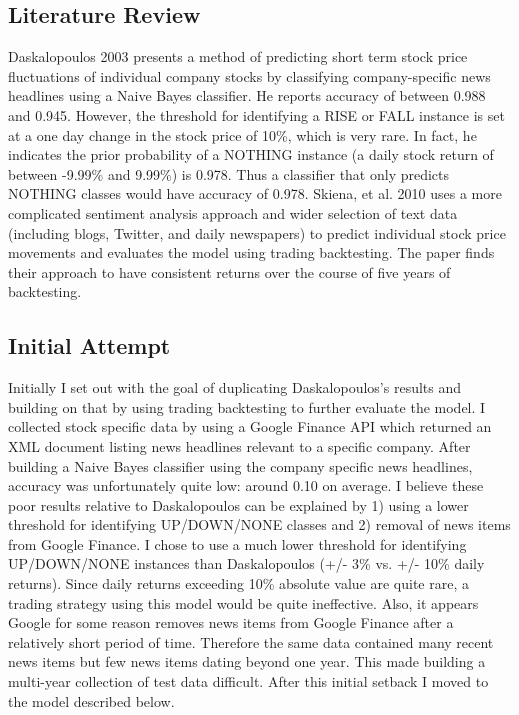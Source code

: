 \documentclass[]{article}
\begin{document}
\subsection{Literature Review}
Daskalopoulos 2003 presents a method of predicting short term stock price fluctuations of individual company stocks by classifying company-specific news headlines using a Naive Bayes classifier\cite{dask03}.  He reports accuracy of between 0.988 and 0.945.  However, the threshold for identifying a RISE or FALL instance is set at a one day change in the stock price of 10\%, which is very rare.  In fact, he indicates the prior probability of a NOTHING instance (a daily stock return of between -9.99\% and 9.99\%) is 0.978.  Thus a classifier that only predicts NOTHING classes would have accuracy of 0.978. Skiena, et al. 2010 uses a more complicated sentiment analysis approach and wider selection of text data (including blogs, Twitter, and daily newspapers) to predict individual stock price movements and evaluates the model using trading backtesting.  The paper finds their approach to have consistent returns over the course of five years of backtesting\cite{skiena10}. 
\subsection{Initial Attempt}
Initially I set out with the goal of duplicating Daskalopoulos's\cite{dask03} results and building on that by using trading backtesting to further evaluate the model.  I collected stock specific data by using a Google Finance API which returned an XML document listing news headlines relevant to a specific company.  After building a Naive Bayes classifier using the company specific news headlines, accuracy was unfortunately quite low: around 0.10 on average.  I believe these poor results relative to Daskalopoulos can be explained by 1) using a lower threshold for identifying UP/DOWN/NONE classes and 2) removal of news items from Google Finance.  I chose to use a much lower threshold for identifying UP/DOWN/NONE instances than Daskalopoulos (+/- 3\% vs. +/- 10\% daily returns).  Since daily returns exceeding 10\% absolute value are quite rare, a trading strategy using this model would be quite ineffective.  Also, it appears Google for some reason removes news items from Google Finance after a relatively short period of time.  Therefore the same data contained many recent news items but few news items dating beyond one year.  This made building a multi-year collection of test data difficult.  After this initial setback I moved to the model described below.
\end{document}
